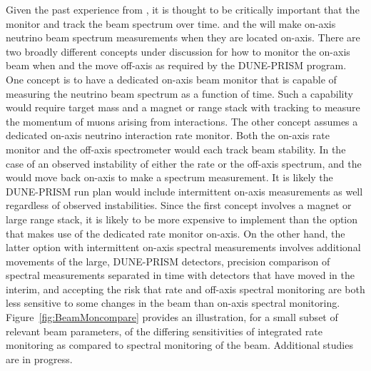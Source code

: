 Given the past experience from , it is thought to be critically important that the   monitor and track the beam spectrum over time.     and the  will make on-axis neutrino beam spectrum measurements when they are located on-axis.  There are two broadly different concepts under discussion for how to monitor the on-axis beam when  and the  move off-axis as required by the DUNE-PRISM program.  One concept is to have a dedicated on-axis beam monitor that is capable of measuring the neutrino beam spectrum as a function of time.  Such a capability would require target mass and a magnet or range stack with tracking to measure the momentum of muons arising from  \numu interactions.  The other concept assumes a dedicated on-axis neutrino interaction rate monitor.  Both the on-axis rate monitor and the off-axis spectrometer would each track beam stability. In the case of an observed instability of either the rate or the off-axis spectrum,  and the  would move back on-axis to make a spectrum measurement. It is likely the DUNE-PRISM run plan would include intermittent on-axis measurements as well regardless of observed instabilities.  Since the first concept involves a magnet or large range stack, it is likely to be more expensive to implement than the option that makes use of the dedicated rate monitor on-axis.  On the other hand, the latter option with intermittent on-axis spectral measurements involves additional movements of the large, DUNE-PRISM detectors, precision comparison of spectral measurements separated in time with detectors that have moved in the interim, and accepting the risk that rate and off-axis spectral monitoring are both less sensitive to some changes in the beam than on-axis spectral monitoring.  Figure~\ref{fig:BeamMoncompare} provides an illustration, for a small subset of relevant beam parameters, of the differing sensitivities of integrated rate monitoring as compared to spectral monitoring of the beam.  Additional studies are in progress.


